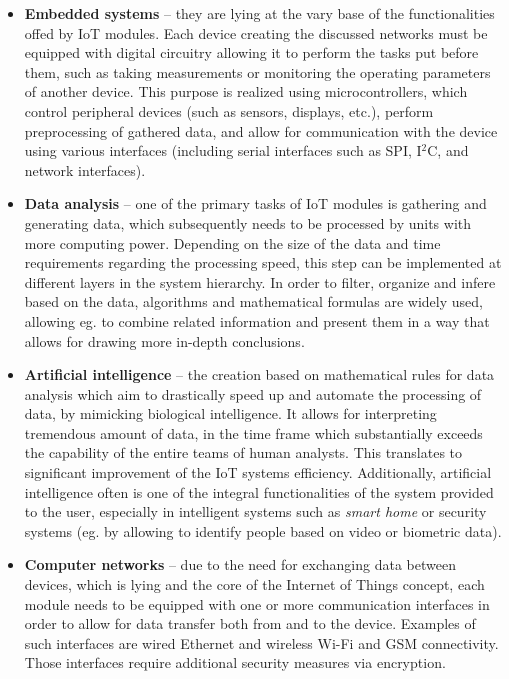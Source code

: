 \begin{itemize}
	\item [$\bullet$] \textbf{Embedded systems} -- they are lying at the vary base of the functionalities offed by IoT modules. Each device creating the discussed networks must be equipped with digital circuitry allowing it to perform the tasks put before them, such as taking measurements or monitoring the operating parameters of another device. This purpose is realized using microcontrollers, which control peripheral devices (such as sensors, displays, etc.), perform preprocessing of gathered data, and allow for communication with the device using various interfaces (including serial interfaces such as SPI, I$^2$C, and network interfaces).
	
	\newpage
	\item [$\bullet$] \textbf{Data analysis} -- one of the primary tasks of IoT modules is gathering and generating data, which subsequently needs to be processed by units with more computing power. Depending on the size of the data and time requirements regarding the processing speed, this step can be implemented at different layers in the system hierarchy. In order to filter, organize and infere based on the data, algorithms and mathematical formulas are widely used, allowing eg. to combine related information and present them in a way that allows for drawing more in-depth conclusions.
	
	\item [$\bullet$] \textbf{Artificial intelligence} -- the creation based on mathematical rules for data analysis which aim to drastically speed up and automate the processing of data, by mimicking biological intelligence. It allows for interpreting tremendous amount of data, in the time frame which substantially exceeds the capability of the entire teams of human analysts. This translates to significant improvement of the IoT systems efficiency. Additionally, artificial intelligence often is one of the integral functionalities of the system provided to the user, especially in intelligent systems such as \emph{smart home} or security systems (eg. by allowing to identify people based on video or biometric data).
	
	\item [$\bullet$] \textbf{Computer networks} -- due to the need for exchanging data between devices, which is lying and the core of the Internet of Things concept, each module needs to be equipped with one or more communication interfaces in order to allow for data transfer both from and to the device. Examples of such interfaces are wired Ethernet and wireless Wi-Fi and GSM connectivity. Those interfaces require additional security measures via encryption.


\end{itemize}
